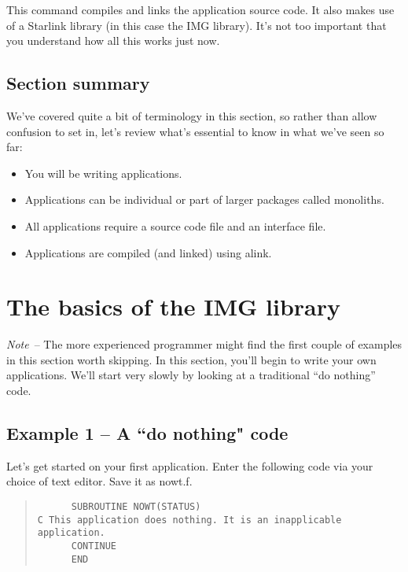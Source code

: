 This command compiles and links the application source code. It 
also makes use of a Starlink library (in this case the IMG library).
It's not too important that you understand how all this works just 
now. 

\subsection{Section summary}

We've covered quite a bit of terminology in this section, so rather than 
allow confusion to set in, let's review what's essential to know in 
what we've seen so far:

\begin{itemize}
\item You will be writing applications.
\item Applications can be individual or part of larger packages
called monoliths.
\item All applications require a source code file and an interface file.
\item Applications are compiled (and linked) using {\sf alink}.
\end{itemize}

\section{The basics of the IMG library}

      {\em Note}\, -- The more experienced programmer might find the first
      couple of examples in this section worth skipping.
      In this section, you'll begin to write your own applications. We'll
      start very slowly by looking at a traditional ``do nothing'' code. 

\subsection{Example 1 -- A ``do nothing" code}

      Let's get started on your first application. Enter the following
      code via your choice of text editor. Save it as {\sf nowt.f}.

\begin{quote}
{\small
\begin{verbatim}
      SUBROUTINE NOWT(STATUS)
C This application does nothing. It is an inapplicable application.
      CONTINUE
      END
\end{verbatim}
}
\end{quote}

